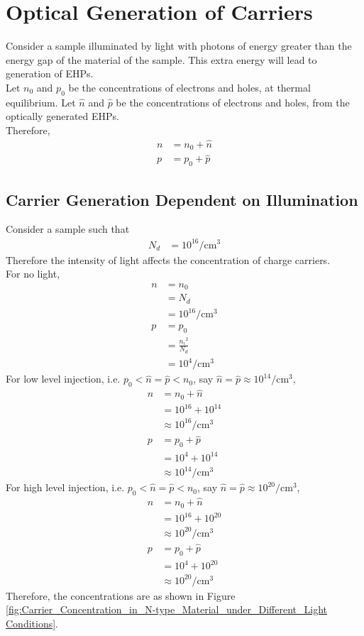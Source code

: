 \documentclass[titlepage, fleqn, a4paper, 12pt, twoside]{article}
\theoremstyle{definition}
\theoremstyle{theorem}
\begin{document}
\section{Optical Generation of Carriers}

Consider a sample illuminated by light with photons of energy greater than the energy gap of the material of the sample.
This extra energy will lead to generation of EHPs.\\
Let $n_0$ and $p_0$ be the concentrations of electrons and holes, at thermal equilibrium.
Let $\hat{n}$ and $\hat{p}$ be the concentrations of electrons and holes, from the optically generated EHPs.\\
Therefore,
\begin{align*}
	n &= n_0 + \hat{n}\\
	p &= p_0 + \hat{p}
\end{align*}

\subsection{Carrier Generation Dependent on Illumination}

Consider a sample such that
\begin{align*}
	N_d &= 10^{16} \si{\per\centi\metre\cubed}
\end{align*}
Therefore the intensity of light affects the concentration of charge carriers.\\
For no light,
\begin{align*}
	n &= n_0\\
	&= N_d\\
	&= 10^{16} \si{\per\centi\metre\cubed}\\
	p &= p_0\\
	&= \frac{{n_i}^2}{N_d}\\
	&= 10^4 \si{\per\centi\metre\cubed}
\end{align*}
For low level injection, i.e. ${p_0 < \hat{n} = \hat{p} < n_0}$, say $\hat{n} = \hat{p} \approx 10^{14} \si{\per\centi\metre\cubed}$,
\begin{align*}
	n &= n_0 + \hat{n}\\
	&= 10^{16} + 10^{14}\\
	&\approx 10^{16} \si{\per\centi\metre\cubed}\\
	p &= p_0 + \hat{p}\\
	&= 10^4 + 10^{14}\\
	&\approx 10^{14} \si{\per\centi\metre\cubed}
\end{align*}
For high level injection, i.e. ${p_0 < \hat{n} = \hat{p} < n_0}$, say $\hat{n} = \hat{p} \approx 10^{20} \si{\per\centi\metre\cubed}$,
\begin{align*}
	n &= n_0 + \hat{n}\\
	&= 10^{16} + 10^{20}\\
	&\approx 10^{20} \si{\per\centi\metre\cubed}\\
	p &= p_0 + \hat{p}\\
	&= 10^4 + 10^{20}\\
	&\approx 10^{20} \si{\per\centi\metre\cubed}
\end{align*}
Therefore, the concentrations are as shown in Figure \ref{fig:Carrier_Concentration_in_N-type_Material_under_Different_Light Conditions}.
\end{document}
